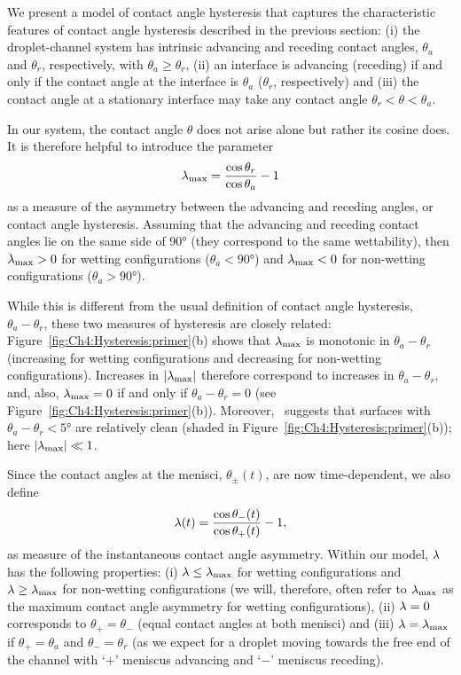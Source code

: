 We present a model of contact angle hysteresis that captures the characteristic features of contact angle hysteresis described in the previous section: (i) the droplet-channel system has intrinsic advancing and receding contact angles, $\theta_a$ and $\theta_r$, respectively, with $\theta_a \geq \theta_r$, (ii) an interface is advancing (receding) if and only if the contact angle at the interface is $\theta_a$ ($\theta_r$, respectively) and (iii) the contact angle at a stationary interface may take any contact angle $\theta_r < \theta < \theta_a$.

In our system, the contact angle $\theta$ does not arise alone but rather its cosine does. It is therefore helpful to introduce the parameter
\begin{equation}\label{E:ch4:Hysteresis:Parametrisation:hyspar_def}
\lambda_{\text{max}} = \frac{\cos \theta_r}{\cos \theta_a} - 1
\end{equation}
as a measure of the asymmetry between the advancing and receding angles, or contact angle hysteresis. Assuming that the advancing and receding contact angles lie on the same side of 90$\si{\degree}$ (they correspond to the same wettability), then $\lambda_{\text{max}} >0$ for wetting configurations ($\theta_a < 90\si{\degree}$) and $\lambda_{\text{max}} <0$ for non-wetting configurations ($\theta_a > 90\si{\degree}$).

While this is different from the usual definition of contact angle hysteresis, $\theta_a - \theta_r$, these two measures of hysteresis are closely related:  Figure~\ref{fig:Ch4:Hysteresis:primer}(b) shows that $\lambda_{\text{max}}$ is monotonic in $\theta_a - \theta_r$ (increasing for wetting configurations and decreasing for non-wetting configurations). Increases in $|\lambda_{\text{max}}|$ therefore correspond to increases in $\theta_a - \theta_r$, and, also, $\lambda_{\text{max}} = 0$ if and only if $\theta_a - \theta_r = 0$ (see Figure~\ref{fig:Ch4:Hysteresis:primer}(b)). Moreover,~\cite{deGennes2004} suggests that surfaces with $\theta_a - \theta_r < 5\si{\degree}$ are relatively clean (shaded in Figure~\ref{fig:Ch4:Hysteresis:primer}(b)); here $|\lambda_{\text{max}}|\ll 1$.

Since the contact angles at the menisci, $\theta_{\pm}(t)$, are now time-dependent, we also define
\begin{equation}\label{E:ch4:Hysteresis:Parametrisation:hyspar_dynamic_def}
\lambda(t) =  \frac{\cos \theta_-(t)}{\cos \theta_+(t)} - 1,
\end{equation}
as measure of the instantaneous contact angle asymmetry. Within our model, $\lambda$ has the following properties: (i) $\lambda \leq \lambda_{\text{max}}$ for wetting configurations and $\lambda \geq \lambda_{\text{max}}$ for non-wetting configurations (we will, therefore, often refer to $\lambda_{\text{max}}$ as the maximum contact angle asymmetry for wetting configurations), (ii)  $\lambda = 0$ corresponds to $\theta_+ = \theta_-$ (equal contact angles at both menisci) and (iii) $\lambda = \lambda_{\text{max}}$ if $\theta_+ = \theta_a$ and $\theta_- = \theta_r$ (as we expect for a droplet moving towards the free end of the channel with `$+$'  meniscus advancing and `$-$' meniscus receding).

